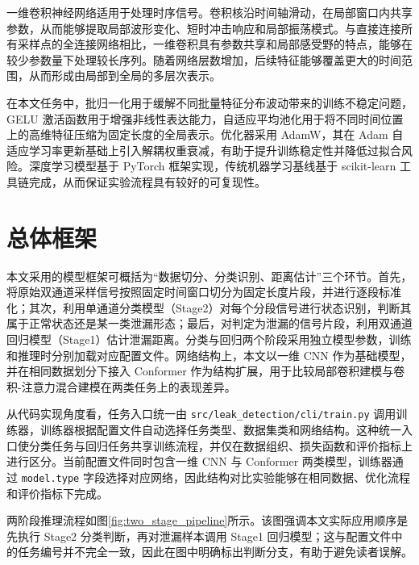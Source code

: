 一维卷积神经网络适用于处理时序信号。卷积核沿时间轴滑动，在局部窗口内共享参数，从而能够提取局部波形变化、短时冲击响应和局部振荡模式。与直接连接所有采样点的全连接网络相比，一维卷积具有参数共享和局部感受野的特点，能够在较少参数量下处理较长序列。随着网络层数增加，后续特征能够覆盖更大的时间范围，从而形成由局部到全局的多层次表示。

在本文任务中，批归一化用于缓解不同批量特征分布波动带来的训练不稳定问题，GELU 激活函数用于增强非线性表达能力，自适应平均池化用于将不同时间位置上的高维特征压缩为固定长度的全局表示。优化器采用 AdamW，其在 Adam 自适应学习率更新基础上引入解耦权重衰减，有助于提升训练稳定性并降低过拟合风险。深度学习模型基于 PyTorch 框架实现\cite{paszke2019pytorch}，传统机器学习基线基于 scikit-learn 工具链完成\cite{pedregosa2011sklearn}，从而保证实验流程具有较好的可复现性。

\section{总体框架}

本文采用的模型框架可概括为“数据切分、分类识别、距离估计”三个环节。首先，将原始双通道采样信号按照固定时间窗口切分为固定长度片段，并进行逐段标准化；其次，利用单通道分类模型（Stage2）对每个分段信号进行状态识别，判断其属于正常状态还是某一类泄漏形态；最后，对判定为泄漏的信号片段，利用双通道回归模型（Stage1）估计泄漏距离。分类与回归两个阶段采用独立模型参数，训练和推理时分别加载对应配置文件。网络结构上，本文以一维 CNN 作为基础模型，并在相同数据划分下接入 Conformer 作为结构扩展，用于比较局部卷积建模与卷积-注意力混合建模在两类任务上的表现差异。

从代码实现角度看，任务入口统一由 \texttt{src/leak\_detection/cli/train.py} 调用训练器，训练器根据配置文件自动选择任务类型、数据集类和网络结构。这种统一入口使分类任务与回归任务共享训练流程，并仅在数据组织、损失函数和评价指标上进行区分。当前配置文件同时包含一维 CNN 与 Conformer 两类模型，训练器通过 \texttt{model.type} 字段选择对应网络，因此结构对比实验能够在相同数据、优化流程和评价指标下完成。

两阶段推理流程如图\ref{fig:two_stage_pipeline}所示。该图强调本文实际应用顺序是先执行 Stage2 分类判断，再对泄漏样本调用 Stage1 回归模型；这与配置文件中的任务编号并不完全一致，因此在图中明确标出判断分支，有助于避免读者误解。

